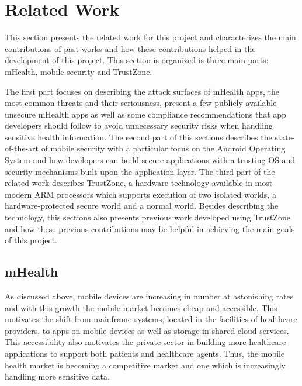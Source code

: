 
% 
% 
\section{Related Work}


This section presents the related work for this project and characterizes the main contributions of past works and how these contributions helped in the development of this project. This section is organized is three main parts: mHealth, mobile security and TrustZone.

The first part focuses on describing the attack surfaces of mHealth apps, the most common threats and their seriousness, present a few publicly available unsecure mHealth apps as well as some compliance recommendations that app developers should follow to avoid unnecessary security risks when handling sensitive health information. The second part of this sections describes the state-of-the-art of mobile security with a particular focus on the Android Operating System and how developers can build secure applications with a trusting \ac{OS} and security mechanisms built upon the application layer. The third part of the related work describes TrustZone, a hardware technology available in most modern \ac{ARM} processors which supports execution of two isolated worlds, a hardware-protected secure world and a normal world. Besides describing the technology, this sections also presents previous work developed using TrustZone and how these previous contributions may be helpful in achieving the main goals of this project. 

\subsection{mHealth}

As discussed above, mobile devices are increasing in number at astonishing rates and with this growth the mobile market becomes cheap and accessible. This motivates the shift from mainframe systems, located in the facilities of healthcare providers, to apps on mobile devices as well as storage in shared cloud services. This accessibility also motivates the private sector in building more healthcare applications to support both patients and healthcare agents. Thus, the mobile health market is becoming a competitive market and one which is increasingly handling more sensitive data.

